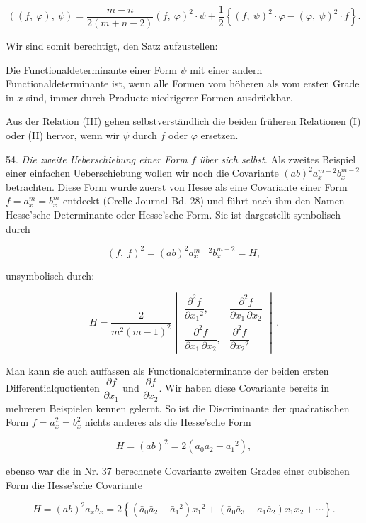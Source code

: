 \documentclass[11pt]{article}
\providecommand{\weberpage}[1]{}
\providecommand{\weq}[2]{\begin{equation}\tag{#1}#2\end{equation}}
\begin{document}
\weq{III}{((f,\ \varphi),\ \psi) = \frac{m-n}{2(m+n-2)}(f,\ \varphi)^2\cdot\psi + \frac{1}{2}\left\{(f,\ \psi)^2\cdot\varphi - (\varphi,\ \psi)^2\cdot f\right\}.}

Wir sind somit berechtigt, den Satz aufzustellen:

\glqq Die Functionaldeterminante einer Form $\psi$ mit einer andern Functionaldeterminante ist, wenn alle Formen vom höheren als vom ersten Grade in $x$ sind, immer durch Producte niedrigerer Formen ausdrückbar.\grqq{}

Aus der Relation (III) gehen selbstverständlich die beiden früheren Relationen (I) oder (II) hervor, wenn wir $\psi$ durch $f$ oder $\varphi$ ersetzen.


\weberpage{58}
54. \textit{Die zweite Ueberschiebung einer Form $f$ über sich selbst.} Als zweites Beispiel einer einfachen Ueberschiebung wollen wir noch die Covariante $(ab)^2 a_x^{m-2}b_x^{m-2}$ betrachten. Diese Form wurde zuerst von Hesse als eine Covariante einer Form $f = a_x^m = b_x^m$ entdeckt (Crelle Journal Bd. 28) und führt nach ihm den Namen Hesse'sche Determinante oder Hesse'sche Form. Sie ist dargestellt symbolisch durch

\[
(f,\ f)^2 = (ab)^2 a_x^{m-2}b_x^{m-2} = H,
\]

unsymbolisch durch:

\[
H = \frac{2}{m^2(m-1)^2}
\begin{vmatrix}
\dfrac{\partial^2 f}{\partial x_1{}^2}, & \dfrac{\partial^2 f}{\partial x_1\,\partial x_2} \\[2ex]
\dfrac{\partial^2 f}{\partial x_1\,\partial x_2}, & \dfrac{\partial^2 f}{\partial x_2{}^2}
\end{vmatrix}\,.
\]

Man kann sie auch auffassen als Functionaldeterminante der beiden ersten Differentialquotienten $\dfrac{\partial f}{\partial x_1}$ und $\dfrac{\partial f}{\partial x_2}$. Wir haben diese Covariante bereits in mehreren Beispielen kennen gelernt. So ist die Discriminante der quadratischen Form $f = a_x^2 = b_x^2$ nichts anderes als die Hesse'sche Form

\[
H = (ab)^2 = 2(\bar a_0\bar a_2 - \bar a_1{}^2),
\]

ebenso war die in Nr. 37 berechnete Covariante zweiten Grades einer cubischen Form die Hesse'sche Covariante

\[
H = (ab)^2 a_x b_x = 2\left\{(\bar a_0\bar a_2 - \bar a_1{}^2)x_1{}^2 + (\bar a_0\bar a_3 - a_1\bar a_2)x_1 x_2 + \cdots\right\}.
\]
\end{document}
